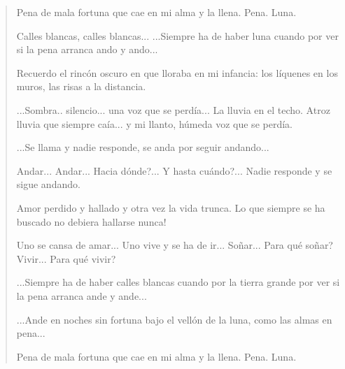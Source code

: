 \documentclass[12pt]{article}
\begin{document}
\clearpage
{}
\begin{verse}
Pena de mala fortuna  
que cae en mi alma y la llena.  
Pena.  
Luna.  
	
Calles blancas, calles blancas...  
...Siempre ha de haber luna cuando  
por ver si la pena arranca  
ando  
y ando...  
	
Recuerdo el rincón oscuro  
en que lloraba en mi infancia:  
los líquenes en los muros,  
las risas a la distancia.  
	
...Sombra.. silencio... una voz  
que se perdía...  
La lluvia en el techo. Atroz  
lluvia que siempre caía...  
y mi llanto, húmeda voz  
que se perdía.  
	
...Se llama y nadie responde,  
se anda por seguir andando...  
	
Andar... Andar... Hacia dónde?...  
Y hasta cuándo?...  
Nadie responde  
y se sigue andando.  
	
Amor perdido y hallado  
y otra vez la vida trunca.  
Lo que siempre se ha buscado  
no debiera hallarse nunca!  
	
Uno se cansa de amar...  
Uno vive y se ha de ir...  
Soñar... Para qué soñar?  
Vivir... Para qué vivir?  
	
...Siempre ha de haber calles blancas  
cuando por la tierra grande  
por ver si la pena arranca  
ande  
y ande...  
	
...Ande en noches sin fortuna  
bajo el vellón de la luna,  
como las almas en pena...  
	
Pena de mala fortuna  
que cae en mi alma y la llena.  
Pena.  
Luna.

\end{verse}
\end{document}

